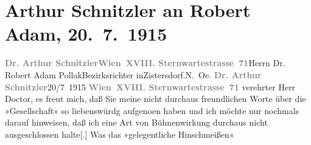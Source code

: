 

         
         \renewcommand{\erwaehntePersonen}{Personen: Robert Adam}
         \renewcommand{\erwaehnteOrte}{Orte: Niederösterreich, Sternwartestraße 71, Wien, XVIII., Währing, Zistersdorf}
         \renewcommand{\erwaehnteWerke}{Werke: Gesellschaft [Eine Gaunerkomödie], Rechtsphilosophie}
               \section[Arthur Schnitzler an Robert Adam, 20. 7. 1915]{ Arthur Schnitzler an Robert Adam, 20. 7. 1915}\nopagebreak{}\rehead{ }\begin{ledgroupsized}[t]{13cm}\normalsize\beginnumbering{} \toendnotes[C]{\smallbreak\pagebreak[2]} 
\pstart{}{\pb}\textcolor{gray}{\textbf{Dr. Arthur Schnitzler}}\pend{}\pstart{}\textcolor{gray}{\textbf{Wien XVIII. Sternwartestrasse 71}}\pend{}{\bigskip}\pstart{}{\pb}Herrn Dr. Robert Adam Pollak\pend{}\pstart{}Bezirksrichter in\pend{}\pstart{}Zistersdorf.\pend{}\pstart{}N. Oe.\pend{}{\bigskip}\pstart
           \noindent{}{\pb}\textcolor{gray}{\textbf{Dr. Arthur Schnitzler}}\hfill 20/7 1915\pend
           \pstart
           \textcolor{gray}{\textbf{Wien XVIII. Sternwartestrasse 71}}\pend
           \pstart
           verehrter Herr Doctor, es freut mich, daß Sie meine nicht durchaus
               freundlichen Worte über die »Gesellschaft« so
               liebenswürdg aufgeno{\geminationm}en haben und ich möchte nur
               nochmals darauf hinweisen, daß ich eine Art von Bühnenwirkung durchaus nicht
               ausgeschlossen halte{[}.{]} Was das »gelegentliche Hinschmeißen«

\end{ledgroupsized}
